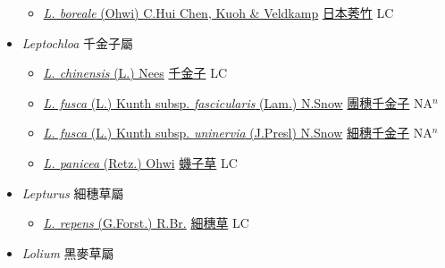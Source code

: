\begin{itemize}
  \begin{itemize}
        \item[] \href{http://www.theplantlist.org/tpl1.1/search?q=Leptatherum+boreale}{\textit{L. boreale} (Ohwi) C.Hui Chen, Kuoh \& Veldkamp}   \href{\detokenize{http://taibnet.sinica.edu.tw/chi/taibnet_species_list.php?T2=日本莠竹&T2_new_value=true&fr=y}}{日本莠竹} LC
  \end{itemize}
 \item[] \textit{Leptochloa} 千金子屬
                    
  \begin{itemize}
        \item[] \href{http://www.theplantlist.org/tpl1.1/search?q=Leptochloa+chinensis}{\textit{L. chinensis} (L.) Nees}   \href{\detokenize{http://taibnet.sinica.edu.tw/chi/taibnet_species_list.php?T2=千金子&T2_new_value=true&fr=y}}{千金子} LC
        \item[] \href{http://www.theplantlist.org/tpl1.1/search?q=Leptochloa+fusca+subsp.+fascicularis}{\textit{L. fusca} (L.) Kunth subsp. \textit{fascicularis} (Lam.) N.Snow}   \href{\detokenize{http://taibnet.sinica.edu.tw/chi/taibnet_species_list.php?T2=團穗千金子&T2_new_value=true&fr=y}}{團穗千金子} NA$^n$
        \item[] \href{http://www.theplantlist.org/tpl1.1/search?q=Leptochloa+fusca+subsp.+uninervia}{\textit{L. fusca} (L.) Kunth subsp. \textit{uninervia} (J.Presl) N.Snow}   \href{\detokenize{http://taibnet.sinica.edu.tw/chi/taibnet_species_list.php?T2=細穗千金子&T2_new_value=true&fr=y}}{細穗千金子} NA$^n$
        \item[] \href{http://www.theplantlist.org/tpl1.1/search?q=Leptochloa+panicea}{\textit{L. panicea} (Retz.) Ohwi}   \href{\detokenize{http://taibnet.sinica.edu.tw/chi/taibnet_species_list.php?T2=蟣子草&T2_new_value=true&fr=y}}{蟣子草} LC
  \end{itemize}
 \item[] \textit{Lepturus} 細穗草屬
                    
  \begin{itemize}
        \item[] \href{http://www.theplantlist.org/tpl1.1/search?q=Lepturus+repens}{\textit{L. repens} (G.Forst.) R.Br.}   \href{\detokenize{http://taibnet.sinica.edu.tw/chi/taibnet_species_list.php?T2=細穗草&T2_new_value=true&fr=y}}{細穗草} LC
  \end{itemize}
 \item[] \textit{Lolium} 黑麥草屬
                    

\end{itemize}
